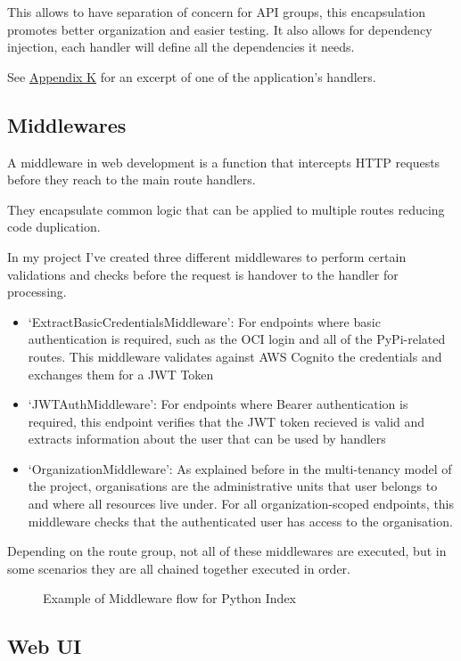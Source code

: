 \documentclass{article}
\newcommand{\widefig}[3][1.2\textwidth]{%
  \begin{figure}[H]
    \makebox[\textwidth][c]{%
      \texttt{[image: \#2]}%
    }
    \caption{#3}
  \end{figure}
}
\begin{document}
  This allows to have separation of concern for API groups, this encapsulation promotes better organization and easier testing. It also allows for dependency injection, each handler will define all the dependencies it needs.

  See \hyperref[sec:appendix-k]{Appendix K} for an excerpt of one of the application's handlers.

  \subsection{Middlewares}

  A middleware in web development is a function that intercepts HTTP requests before they reach to the main route handlers.

  They encapsulate common logic that can be applied to multiple routes reducing code duplication.

  In my project I've created three different middlewares to perform certain validations and checks before the request is handover to the handler for processing.

  \begin{itemize}
    \item `ExtractBasicCredentialsMiddleware': For endpoints where basic authentication is required, such as the OCI login and all of the PyPi-related routes. This middleware validates against AWS Cognito the credentials and exchanges them for a JWT Token
    \item `JWTAuthMiddleware': For endpoints where Bearer authentication is required, this endpoint verifies that the JWT token recieved is valid and extracts information about the user that can be used by handlers
    \item `OrganizationMiddleware': As explained before in the multi-tenancy model of the project, organisations are the administrative units that user belongs to and where all resources live under. For all organization-scoped endpoints, this middleware checks that the authenticated user has access to the organisation.
  \end{itemize}
  
  Depending on the route group, not all of these middlewares are executed, but in some scenarios they are all chained together executed in order.

  \widefig{appendix/middleware-flow-python-example.png}{Example of Middleware flow for Python Index}

  \subsection{Web UI}
\end{document}
